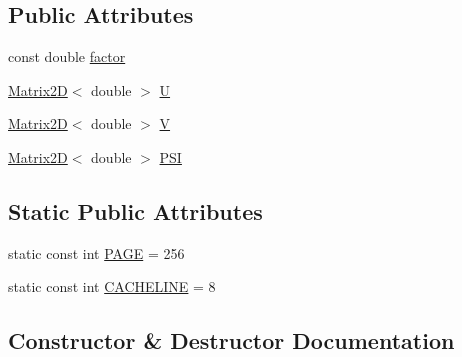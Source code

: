 \subsection*{Public Attributes}
\begin{DoxyCompactItemize}
\item 
const double \hyperlink{struct_u_vfrom_p_s_i___s_s_e_3_01double_01_4_a13a8e60c24481a28b30a5bfff9de6d57}{factor}
\item 
\hyperlink{class_matrix2_d}{Matrix2\+D}$<$ double $>$ \hyperlink{struct_u_vfrom_p_s_i___s_s_e_3_01double_01_4_a4dc3dc281fa328c5b353e97610b762d8}{U}
\item 
\hyperlink{class_matrix2_d}{Matrix2\+D}$<$ double $>$ \hyperlink{struct_u_vfrom_p_s_i___s_s_e_3_01double_01_4_a7e5177ab59f35582a6782b43106ec3d8}{V}
\item 
\hyperlink{class_matrix2_d}{Matrix2\+D}$<$ double $>$ \hyperlink{struct_u_vfrom_p_s_i___s_s_e_3_01double_01_4_a85a52a48e0761ffe50e94a48ec6c652e}{P\+S\+I}
\end{DoxyCompactItemize}
\subsection*{Static Public Attributes}
\begin{DoxyCompactItemize}
\item 
static const int \hyperlink{struct_u_vfrom_p_s_i___s_s_e_3_01double_01_4_ab216503dd8df3019354f56281bb0dccb}{P\+A\+G\+E} = 256
\item 
static const int \hyperlink{struct_u_vfrom_p_s_i___s_s_e_3_01double_01_4_a7c07f66fe872ca45505200e597a227d7}{C\+A\+C\+H\+E\+L\+I\+N\+E} = 8
\end{DoxyCompactItemize}


\subsection{Constructor \& Destructor Documentation}
\hypertarget{struct_u_vfrom_p_s_i___s_s_e_3_01double_01_4_ab18d50ac5b80e1cbae7d31b2e4db5a63}{}
